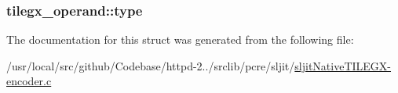 \subsubsection[{\texorpdfstring{type}{type}}]{ tilegx\+\_\+operand\+::type}\hypertarget{structtilegx__operand_ac620d9276a7d3eb83e2ef4c7e70f63c9}{}\label{structtilegx__operand_ac620d9276a7d3eb83e2ef4c7e70f63c9}


The documentation for this struct was generated from the following file\+:\begin{DoxyCompactItemize}
\item 
/usr/local/src/github/\+Codebase/httpd-\/2../srclib/pcre/sljit/\hyperlink{sljitNativeTILEGX-encoder_8c}{sljit\+Native\+T\+I\+L\+E\+G\+X-\/encoder.\+c}\end{DoxyCompactItemize}
